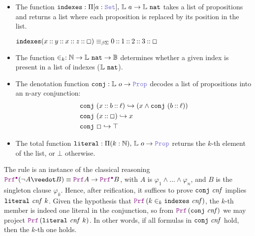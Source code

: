 \begin{itemize}
  \item The function $\kw{indexes}: \Pi [a: \set],\, \bb{L}~a \ra \bb{L}~\kw{nat}$  takes a list of propositions and returns a list where each proposition is replaced by its position in the list.
  \begin{example}[indexes]
  \(
    \mathop{\mathtt{indexes}} (x \mathbin{\mathbin{::}} y \mathbin{\mathbin{::}} x  \mathbin{\mathbin{::}} z \mathbin{\mathbin{::}} \Box) \equiv_{\beta\Sigma} 0 \mathbin{\mathbin{::}} 1 \mathbin{\mathbin{::}} 2 \mathbin{\mathbin{::}} 3 \mathbin{\mathbin{::}} \Box
  \)
  \end{example}
  \item The function $\in_k : \mathbb{N} \rightarrow \mathbb{L}~\texttt{\upshape{nat}} \rightarrow \mathbb{B}$  determines whether a given index is present in a list of indexes ($\mathbb{L}~\texttt{\upshape{nat}}$).
  \item The denotation function $\kw{conj}: \bb{L}~o \ra \prop$ decodes a list of propositions into an n-ary conjunction:
  \[
    \begin{aligned}
    & \texttt{\upshape{conj}}~(x \mathbin{::} b \mathbin{::} \ell) \hookrightarrow (x \land \texttt{\upshape{conj}}~(b \mathbin{::} \ell))\\
    & \texttt{\upshape{conj}}~(x \mathbin{::} \Box) \hookrightarrow x\\
    & \texttt{\upshape{conj}}~\Box \hookrightarrow \top
    \end{aligned}
    \]
  \item The total function $\kw{literal}: \Pi (k: \N),\, \bb{L}~o \ra \prop$ returns the $k$-th element of the list, or $\bot$ otherwise.
\end{itemize}

The rule  is an instance of the classical reasoning \(\prfcl (\neg A \veedot B) \equiv \prf A \ra \prfcl B\),
with $A$ is $\varphi_1 \land \dots \land \varphi_n$, and $B$ is the singleton clause $\varphi_k$.
Hence, after reification, it suffices to prove $\texttt{\upshape{conj}}~\mathit{cnf}$ implies $\texttt{\upshape{literal}}~\mathit{cnf}~k$.
Given the hypothesis that \(\prf\,(k \in_k \kw{indexes}~\mathit{cnf})\), the $k$-th member is indeed one literal in the conjunction, so from \(\prf\,(\kw{conj}~\mathit{cnf})\) we may project \(\prf\,(\kw{literal}~\mathit{cnf}~k)\).
In other words, if all formulas in \(\texttt{\upshape{conj}}~\mathit{cnf}\) hold, then the $k$-th one holds.

